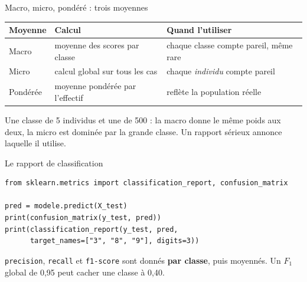 \begin{frame}{Macro, micro, pondéré : trois moyennes}
\begin{center}
\small
\begin{tabular}{@{}p{}p{}p{}@{}}
\toprule
\textbf{Moyenne} & \textbf{Calcul} & \textbf{Quand l'utiliser} \\
\midrule
Macro & moyenne des scores par classe & chaque classe compte pareil, même rare \\
Micro & calcul global sur tous les cas & chaque \emph{individu} compte pareil \\
Pondérée & moyenne pondérée par l'effectif & reflète la population réelle \\
\bottomrule
\end{tabular}
\end{center}
\vspace{2mm}
\begin{kbox}[Exemple]
Une classe de 5 individus et une de 500 : la macro donne le même poids aux deux,
la micro est dominée par la grande classe. Un rapport sérieux annonce laquelle
il utilise.
\end{kbox}
\end{frame}

\begin{frame}[fragile]{Le rapport de classification}
\begin{codebox}
\begin{lstlisting}
from sklearn.metrics import classification_report, confusion_matrix

pred = modele.predict(X_test)
print(confusion_matrix(y_test, pred))
print(classification_report(y_test, pred,
      target_names=["3", "8", "9"], digits=3))
\end{lstlisting}
\end{codebox}
\vspace{1mm}
{\footnotesize
\texttt{precision}, \texttt{recall} et \texttt{f1-score} sont donnés
\textbf{par classe}, puis moyennés. Un $F_1$ global de 0,95 peut cacher une
classe à 0,40.}
\end{frame}


